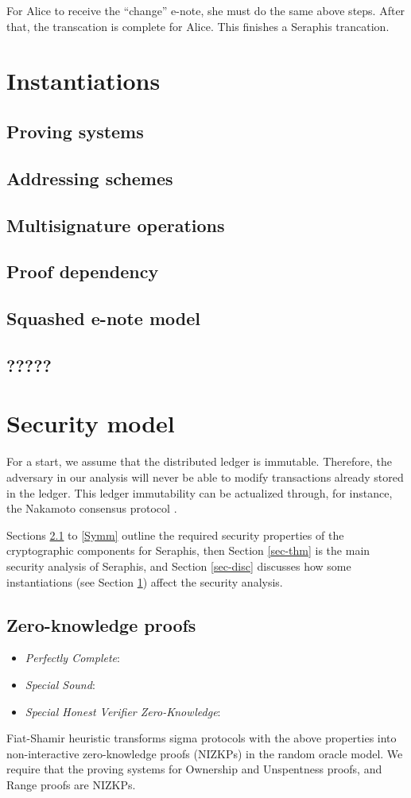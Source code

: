 \documentclass{article}
\begin{document}
For Alice to receive the ``change'' e-note, she must do the same above steps. After that, the transcation is complete for Alice. This finishes a Seraphis trancation.

\section{Instantiations}\label{inst}
\subsection{Proving systems}
\subsection{Addressing schemes}\label{addr-scheme}
\subsection{Multisignature operations}
\subsection{Proof dependency}\label{proof-dep}
\subsection{Squashed e-note model}
\subsection{?????}

\section{Security model}
\noindent For a start, we assume that the distributed ledger is immutable. Therefore, the adversary in our analysis will never be able to modify transactions already stored in the ledger. This ledger immutability can be actualized through, for instance, the Nakamoto consensus protocol \cite{bitcoin}.

Sections \ref{ZKP} to \ref{Symm} outline the required security properties of the cryptographic components for Seraphis, then Section \ref{sec-thm} is the main security analysis of Seraphis, and Section \ref{sec-disc} discusses how some instantiations (see Section \ref{inst}) affect the security analysis.
\subsection{Zero-knowledge proofs}\label{ZKP}
\begin{itemize}
    \item \textit{Perfectly Complete}:
    \item \textit{Special Sound}:
    \item \textit{Special Honest Verifier Zero-Knowledge}:
\end{itemize}
Fiat-Shamir heuristic \cite{fiat-shamir} transforms sigma protocols with the above properties into non-interactive zero-knowledge proofs (NIZKPs) in the random oracle model. We require that the proving systems for Ownership and Unspentness proofs, and Range proofs are NIZKPs.
\end{document}
